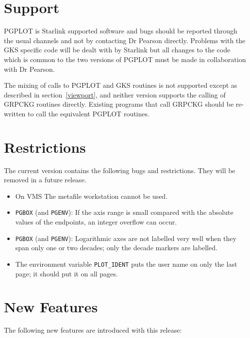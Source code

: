 \section{Support}

PGPLOT is Starlink supported software and bugs should be reported through the
usual channels and not by contacting Dr Pearson directly. Problems with the GKS
specific code will be dealt with by Starlink but all changes to the code which
is common to the two versions of PGPLOT must be made in collaboration with Dr
Pearson.

The mixing of calls to PGPLOT and GKS routines is not supported except as
described in section~\ref{viewport}, and neither
version supports the calling of GRPCKG routines directly. Existing programs
that call GRPCKG should be re-written to call the equivalent PGPLOT routines.

\section{Restrictions}

The current version contains the following bugs and restrictions. They will
be removed in a future release.
\begin{itemize}

\item On VMS The metafile workstation cannot be used. 

\item {\tt PGBOX} (and {\tt PGENV}): If the axis range is small compared with 
the absolute values of the endpoints, an integer overflow can occur.

\item {\tt PGBOX} (and {\tt PGENV}): Logarithmic axes are not labelled 
very well when they span only one or two decades; only the decade markers 
are labelled.

\item The environment variable {\tt PLOT\_IDENT} puts the user name on only 
the last page; it should put it on all pages.

\end{itemize}

\section{New Features}
The following new features are introduced with this release:

